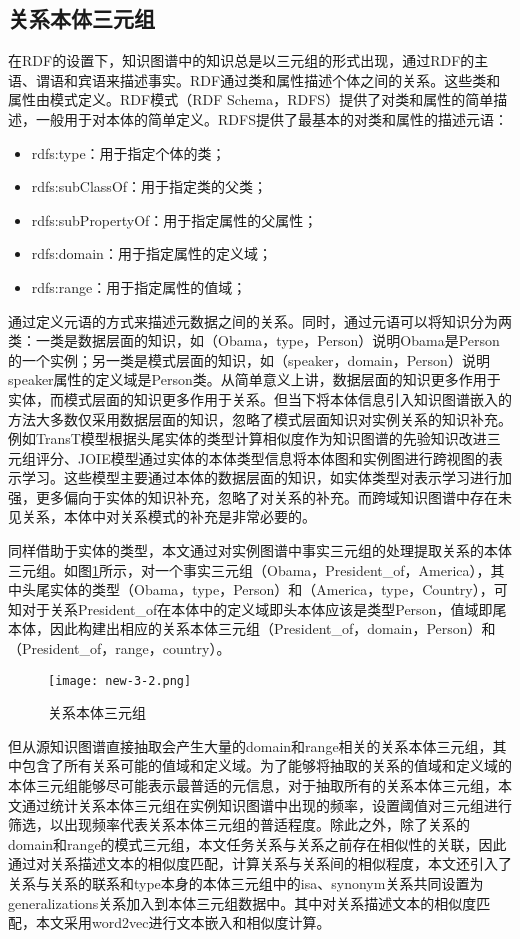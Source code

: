 \subsection{关系本体三元组}
在RDF的设置下，知识图谱中的知识总是以三元组的形式出现，通过RDF的主语、谓语和宾语来描述事实。RDF通过类和属性描述个体之间的关系。这些类和属性由模式定义。RDF模式（RDF Schema，RDFS）提供了对类和属性的简单描述，一般用于对本体的简单定义。RDFS提供了最基本的对类和属性的描述元语：
\begin{itemize}
  \item rdfs:type：用于指定个体的类；
  \item rdfs:subClassOf：用于指定类的父类；
  \item rdfs:subPropertyOf：用于指定属性的父属性；
  \item rdfs:domain：用于指定属性的定义域；
  \item rdfs:range：用于指定属性的值域；
\end{itemize}

通过定义元语的方式来描述元数据之间的关系。同时，通过元语可以将知识分为两类：一类是数据层面的知识，如（Obama，type，Person）说明Obama是Person的一个实例；另一类是模式层面的知识，如（speaker，domain，Person）说明speaker属性的定义域是Person类。从简单意义上讲，数据层面的知识更多作用于实体，而模式层面的知识更多作用于关系。但当下将本体信息引入知识图谱嵌入的方法大多数仅采用数据层面的知识，忽略了模式层面知识对实例关系的知识补充。例如TransT\cite{ma2017transt}模型根据头尾实体的类型计算相似度作为知识图谱的先验知识改进三元组评分、JOIE\cite{hao2019universal}模型通过实体的本体类型信息将本体图和实例图进行跨视图的表示学习。这些模型主要通过本体的数据层面的知识，如实体类型对表示学习进行加强，更多偏向于实体的知识补充，忽略了对关系的补充。而跨域知识图谱中存在未见关系，本体中对关系模式的补充是非常必要的。

同样借助于实体的类型，本文通过对实例图谱中事实三元组的处理提取关系的本体三元组。如图\ref{fig:3-2}所示，对一个事实三元组（Obama，President\_of，America），其中头尾实体的类型（Obama，type，Person）和（America，type，Country），可知对于关系President\_of在本体中的定义域即头本体应该是类型Person，值域即尾本体，因此构建出相应的关系本体三元组（President\_of，domain，Person）和（President\_of，range，country）。
\begin{figure}[h]
  \centering
  \texttt{[image: new-3-2.png]}
  \caption{关系本体三元组}
  \label{fig:3-2}
\end{figure}

但从源知识图谱直接抽取会产生大量的domain和range相关的关系本体三元组，其中包含了所有关系可能的值域和定义域。为了能够将抽取的关系的值域和定义域的本体三元组能够尽可能表示最普适的元信息，对于抽取所有的关系本体三元组，本文通过统计关系本体三元组在实例知识图谱中出现的频率，设置阈值对三元组进行筛选，以出现频率代表关系本体三元组的普适程度。除此之外，除了关系的domain和range的模式三元组，本文任务关系与关系之前存在相似性的关联，因此通过对关系描述文本的相似度匹配，计算关系与关系间的相似程度，本文还引入了关系与关系的联系和type本身的本体三元组中的isa、synonym关系共同设置为generalizations关系加入到本体三元组数据中。其中对关系描述文本的相似度匹配，本文采用word2vec进行文本嵌入和相似度计算。

